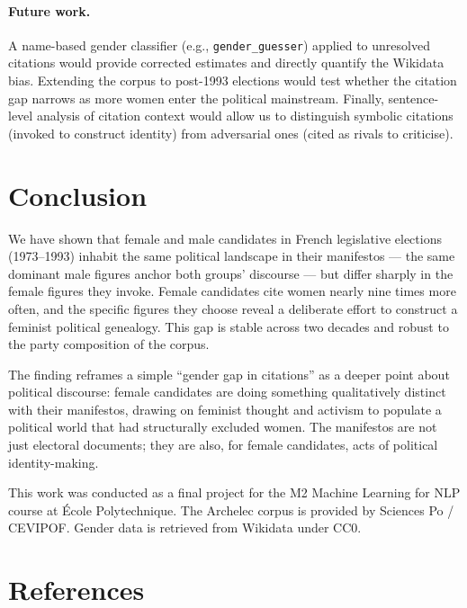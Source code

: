 \documentclass{article}
\begin{document}
\paragraph{Future work.}
A name-based gender classifier (e.g., \texttt{gender\_guesser}) applied to
unresolved citations would provide corrected estimates and directly quantify
the Wikidata bias. Extending the corpus to post-1993 elections would test
whether the citation gap narrows as more women enter the political mainstream.
Finally, sentence-level analysis of citation context would allow us to
distinguish symbolic citations (invoked to construct identity) from adversarial
ones (cited as rivals to criticise).


\section{Conclusion}

We have shown that female and male candidates in French legislative elections
(1973--1993) inhabit the same political landscape in their manifestos — the same
dominant male figures anchor both groups' discourse — but differ sharply in the
female figures they invoke. Female candidates cite women nearly nine times more
often, and the specific figures they choose reveal a deliberate effort to
construct a feminist political genealogy. This gap is stable across two decades
and robust to the party composition of the corpus.

The finding reframes a simple ``gender gap in citations'' as a deeper point about
political discourse: female candidates are doing something qualitatively distinct
with their manifestos, drawing on feminist thought and activism to populate a
political world that had structurally excluded women. The manifestos are not just
electoral documents; they are also, for female candidates, acts of political
identity-making.


\begin{ack}
This work was conducted as a final project for the M2 Machine Learning for NLP
course at École Polytechnique. The Archelec corpus is provided by Sciences Po /
CEVIPOF. Gender data is retrieved from Wikidata under CC0.
\end{ack}

\section*{References}
\end{document}
